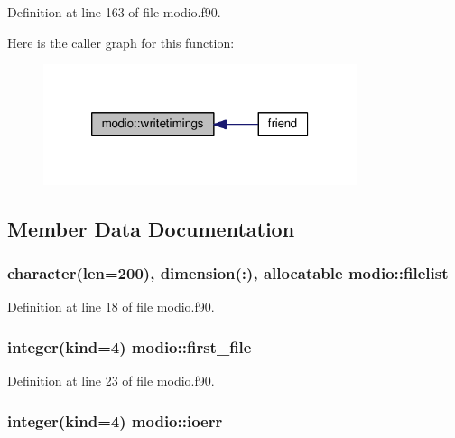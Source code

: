 Definition at line 163 of file modio.\-f90.



Here is the caller graph for this function\-:\nopagebreak
\begin{figure}[H]
\begin{center}
\leavevmode
\includegraphics[width=260pt]{classmodio_a4ae2c63c80099d6d657525db263669b4_icgraph}
\end{center}
\end{figure}




\subsection{Member Data Documentation}
\hypertarget{classmodio_a31e8a393faa96e92df4d56794cd2eadd}{
\subsubsection[{filelist}]{\setlength{\rightskip}{0pt plus 5cm}character(len=200), dimension(\-:), allocatable modio\-::filelist}}\label{classmodio_a31e8a393faa96e92df4d56794cd2eadd}


Definition at line 18 of file modio.\-f90.

\hypertarget{classmodio_a2eee1b20e9f6d0c4ab4e219d76aefc9a}{
\subsubsection[{first\-\_\-file}]{\setlength{\rightskip}{0pt plus 5cm}integer(kind=4) modio\-::first\-\_\-file}}\label{classmodio_a2eee1b20e9f6d0c4ab4e219d76aefc9a}


Definition at line 23 of file modio.\-f90.

\hypertarget{classmodio_a62b213d7b9f52071f903b877ee52c86b}{
\subsubsection[{ioerr}]{\setlength{\rightskip}{0pt plus 5cm}integer(kind=4) modio\-::ioerr}}\label{classmodio_a62b213d7b9f52071f903b877ee52c86b}



